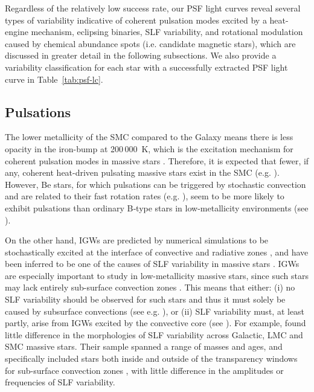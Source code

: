 \documentclass[fleqn,usenatbib]{mnras}
\begin{document}
Regardless of the relatively low success rate, our PSF light curves reveal several types of variability indicative of coherent pulsation modes excited by a heat-engine mechanism, eclipsing binaries, SLF variability, and rotational modulation caused by chemical abundance spots (i.e. candidate magnetic stars), which are discussed in greater detail in the following subsections. We also provide a variability classification for each star with a successfully extracted PSF light curve in Table~\ref{tab:psf-lc}.


\subsection{Pulsations}
The lower metallicity of the SMC compared to the Galaxy means there is less opacity in the iron-bump at 200\,000~K, which is the excitation mechanism for coherent pulsation modes in massive stars \citep{DziembowskiPamyatnykh1993}. Therefore, it is expected that fewer, if any, coherent heat-driven pulsating massive stars exist in the SMC (e.g. \citealt{Salmon+2012}). However, Be stars, for which pulsations can be triggered by stochastic convection and are related to their fast rotation rates (e.g. \citealt{Neiner+2020, Labadie-Bartz2022}), seem to be more likely to exhibit pulsations than ordinary B‑type stars in low-metallicity environments (see \citealt{Diago+2008}).

On the other hand, IGWs are predicted by numerical simulations to be stochastically excited at the interface of convective and radiative zones \citep{Rogers2013, Rogers+2017, Edelmann+2019ApJ, Thompson+2024_3Dsim}, and have been inferred to be one of the causes of SLF variability in massive stars \citep{Bowman+2019_nat, Bowman+2020aa}. IGWs are especially important to study in low-metallicity massive stars, since such stars may lack entirely sub-surface convection zones \citep{Jermyn+2022}. This means that either: (i) no SLF variability should be observed for such stars and thus it must solely be caused by subsurface convections (see e.g. \citealt{Cantiello+2009,Cantiello+2021}), or (ii) SLF variability must, at least partly, arise from IGWs excited by the convective core (see \citealt{Bowman2023}). For example, \citet{BowmanVanDaele2024} found little difference in the morphologies of SLF variability across Galactic, LMC and SMC massive stars. Their sample spanned a range of masses and ages, and specifically included stars both inside and outside of the transparency windows for sub-surface convection zones \citep{Jermyn+2022}, with little difference in the amplitudes or frequencies of SLF variability. 
\end{document}
